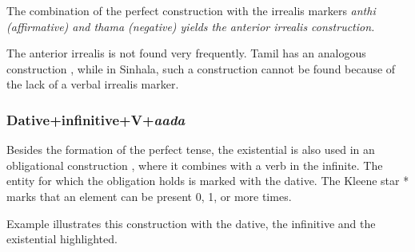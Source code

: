 The combination of the perfect construction with the irrealis markers \em anthi \em (affirmative)  and \em thama \em (negative)  yields the anterior irrealis construction.







The anterior irrealis is not found very frequently. Tamil has an analogous construction \citep[207]{Lehmann1989}, while in Sinhala, such a construction cannot be found because of the lack of a verbal irrealis marker.


\subsubsection[\textsc{dat + inf + V} + \textit{aada}]{Dative+infinitive+V+\em aada\em}\label{sec:wc:Dative+infinitive+V+aada}
Besides the formation of the perfect tense, the existential is also used in an obligational construction , where it combines with a verb in the infinite. The entity for which the obligation holds is marked with the dative. The Kleene star * marks that an element can be present 0, 1, or more times.


Example  illustrates this construction with the dative, the infinitive and the existential highlighted.

